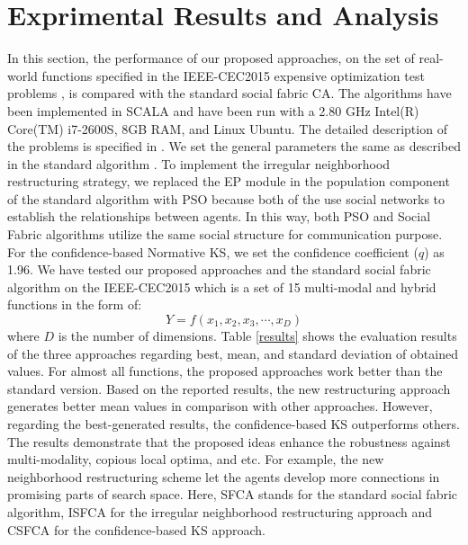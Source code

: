 \documentclass[letterpaper]{article}
\begin{document}
\section{Exprimental Results and Analysis}
In this section, the performance of our proposed approaches, on the set of real-world functions specified in the IEEE-CEC2015 expensive optimization test problems \cite{chen2014problem}, is compared with the standard social fabric CA. The algorithms have been implemented in SCALA and have been run with a 2.80 GHz Intel(R) Core(TM) i7-2600S, 8GB RAM, and Linux Ubuntu. The detailed description of the problems is specified in \cite{chen2014problem}. \newline
We set the general parameters the same as described in the standard algorithm \cite{ali2016leveraged}. To implement the irregular neighborhood restructuring strategy, we replaced the EP module in the population component of the standard algorithm with PSO because both of the use social networks to establish the relationships between agents. In this way, both PSO and Social Fabric algorithms utilize the same social structure for communication purpose. For the confidence-based Normative KS, we set the confidence coefficient ($q$) as 1.96.\newline
We have tested our proposed approaches and the standard social fabric algorithm on the IEEE-CEC2015 which is a set of 15 multi-modal and hybrid functions in the form of: 
\begin{equation}
	Y=f(x_{1}, x_{2}, x_{3}, \cdots, x_{D})
\end{equation}
where $D$ is the number of dimensions.\newline
Table \ref{results} shows the evaluation results of the three approaches regarding best, mean, and standard deviation of obtained values. For almost all functions, the proposed approaches work better than the standard version. Based on the reported results, the new restructuring approach generates better mean values in comparison with other approaches. However, regarding the best-generated results, the confidence-based KS outperforms others. The results demonstrate that the proposed ideas enhance the robustness against multi-modality, copious local optima, and etc. For example, the new neighborhood restructuring scheme let the agents develop more connections in promising parts of search space. Here, SFCA stands for the standard social fabric algorithm, ISFCA for the irregular neighborhood restructuring approach and CSFCA for the confidence-based KS approach.
\end{document}
